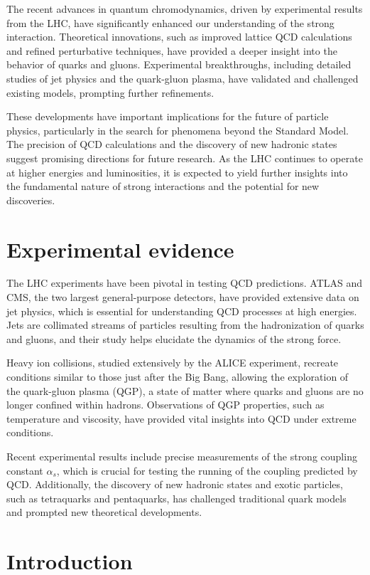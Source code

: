 \documentclass{article}
\begin{document}
The recent advances in quantum chromodynamics, driven by experimental results from the LHC, have significantly enhanced our understanding of the strong interaction. Theoretical innovations, such as improved lattice QCD calculations and refined perturbative techniques, have provided a deeper insight into the behavior of quarks and gluons. Experimental breakthroughs, including detailed studies of jet physics and the quark-gluon plasma, have validated and challenged existing models, prompting further refinements.

These developments have important implications for the future of particle physics, particularly in the search for phenomena beyond the Standard Model. The precision of QCD calculations and the discovery of new hadronic states suggest promising directions for future research. As the LHC continues to operate at higher energies and luminosities, it is expected to yield further insights into the fundamental nature of strong interactions and the potential for new discoveries.

\section{Experimental evidence}

The LHC experiments have been pivotal in testing QCD predictions. ATLAS and CMS, the two largest general-purpose detectors, have provided extensive data on jet physics, which is essential for understanding QCD processes at high energies. Jets are collimated streams of particles resulting from the hadronization of quarks and gluons, and their study helps elucidate the dynamics of the strong force.

Heavy ion collisions, studied extensively by the ALICE experiment, recreate conditions similar to those just after the Big Bang, allowing the exploration of the quark-gluon plasma (QGP), a state of matter where quarks and gluons are no longer confined within hadrons. Observations of QGP properties, such as temperature and viscosity, have provided vital insights into QCD under extreme conditions.

Recent experimental results include precise measurements of the strong coupling constant $\alpha_s$, which is crucial for testing the running of the coupling predicted by QCD. Additionally, the discovery of new hadronic states and exotic particles, such as tetraquarks and pentaquarks, has challenged traditional quark models and prompted new theoretical developments.

\section{Introduction}
\end{document}
